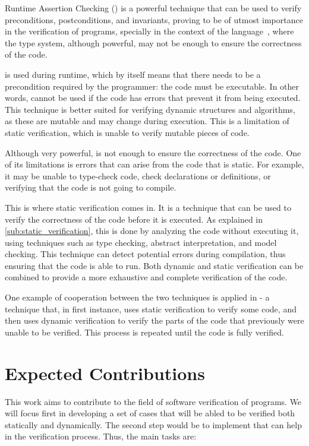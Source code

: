 Runtime Assertion Checking (\rac) is a powerful technique that can be used to verify preconditions, postconditions, and 
invariants, proving to be of utmost importance in the verification of programs, specially 
in the context of the \ocaml language~\cite{Filliatre}, where the type system, 
although powerful, may not be enough to ensure the correctness of the code.

\rac is used during runtime, which by itself means that there needs to be a precondition required 
by the programmer: the code must be executable. In other words, \rac cannot be used if the code 
has errors that prevent it from being executed. This technique is better suited for verifying dynamic 
structures and algorithms, as these are mutable and may change during execution. This is a limitation 
of static verification, which is unable to verify mutable pieces of code.

Although very powerful, \rac is not enough to ensure the correctness of the code. One of its 
limitations is errors that can arise from the code that is static. For example, it may be unable 
to type-check code, check declarations or definitions, or verifying that the code is not going to 
compile.

This is where static verification comes in. It is a technique that can be used to verify the 
correctness of the code before it is executed. As explained in \ref{sub:static_verification}, this is done by analyzing the code without 
executing it, using techniques such as type checking, abstract interpretation, and model checking.
This technique can detect potential errors during compilation, thus ensuring that the code is 
able to run. Both dynamic and static verification can be combined to provide a more exhaustive 
and complete verification of the code.

One example of cooperation between the two techniques is applied in \monitors - a technique that, 
in first instance, uses static verification to verify some code, and then uses dynamic verification 
to verify the parts of the code that previously were unable to be verified. This process is repeated until 
the code is fully verified.

\section{Expected Contributions}
\label{sec:expected_Contributions}

This work aims to contribute to the field of software verification of \ocaml programs. 
We will focus first in developing a set of cases that will be abled to be verified both 
statically and dynamically. The second step would be to implement \monitors that can help 
in the verification process. Thus, the main tasks are:

